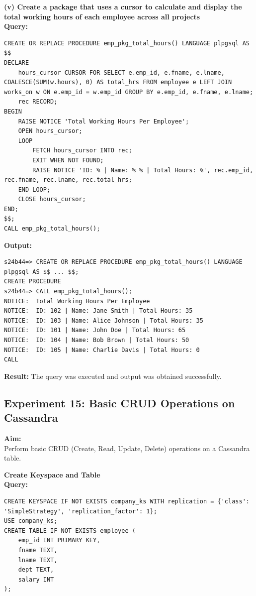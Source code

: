 \documentclass[12pt, a4paper]{article}
\begin{document}
\textbf{(v) Create a package that uses a cursor to calculate and display the total working hours of each employee across all projects}\\
\textbf{Query:}
\begin{lstlisting}
CREATE OR REPLACE PROCEDURE emp_pkg_total_hours() LANGUAGE plpgsql AS $$
DECLARE
    hours_cursor CURSOR FOR SELECT e.emp_id, e.fname, e.lname, COALESCE(SUM(w.hours), 0) AS total_hrs FROM employee e LEFT JOIN works_on w ON e.emp_id = w.emp_id GROUP BY e.emp_id, e.fname, e.lname;
    rec RECORD;
BEGIN
    RAISE NOTICE 'Total Working Hours Per Employee';
    OPEN hours_cursor;
    LOOP
        FETCH hours_cursor INTO rec;
        EXIT WHEN NOT FOUND;
        RAISE NOTICE 'ID: % | Name: % % | Total Hours: %', rec.emp_id, rec.fname, rec.lname, rec.total_hrs;
    END LOOP;
    CLOSE hours_cursor;
END;
$$;
CALL emp_pkg_total_hours();
\end{lstlisting}
\textbf{Output:}
\begin{lstlisting}[style=terminal]
s24b44=> CREATE OR REPLACE PROCEDURE emp_pkg_total_hours() LANGUAGE plpgsql AS $$ ... $$;
CREATE PROCEDURE
s24b44=> CALL emp_pkg_total_hours();
NOTICE:  Total Working Hours Per Employee
NOTICE:  ID: 102 | Name: Jane Smith | Total Hours: 35
NOTICE:  ID: 103 | Name: Alice Johnson | Total Hours: 35
NOTICE:  ID: 101 | Name: John Doe | Total Hours: 65
NOTICE:  ID: 104 | Name: Bob Brown | Total Hours: 50
NOTICE:  ID: 105 | Name: Charlie Davis | Total Hours: 0
CALL
\end{lstlisting}
\textbf{Result:} The query was executed and output was obtained successfully.


\newpage
\subsection*{Experiment 15: Basic CRUD Operations on Cassandra}

\textbf{Aim:}\\
Perform basic CRUD (Create, Read, Update, Delete) operations on a Cassandra table.

\textbf{Create Keyspace and Table}\\
\textbf{Query:}
\begin{lstlisting}
CREATE KEYSPACE IF NOT EXISTS company_ks WITH replication = {'class': 'SimpleStrategy', 'replication_factor': 1};
USE company_ks;
CREATE TABLE IF NOT EXISTS employee (
    emp_id INT PRIMARY KEY,
    fname TEXT,
    lname TEXT,
    dept TEXT,
    salary INT
);
\end{lstlisting}
\end{document}

